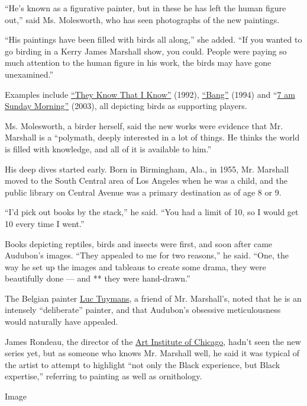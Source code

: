 ``He's known as a figurative painter, but in these he has left the human
figure out,'' said Ms. Molesworth, who has seen photographs of the new
paintings.

``His paintings have been filled with birds all along,'' she added. ``If
you wanted to go birding in a Kerry James Marshall show, you could.
People were paying so much attention to the human figure in his work,
the birds may have gone unexamined.''

Examples include
\href{https://www.metmuseum.org/art/collection/search/668312}{``They
Know That I Know''} (1992),
\href{https://www.metmuseum.org/art/collection/search/668319}{``Bang''}
(1994) and
``\href{https://mcachicago.org/Collection/Items/2003/Kerry-James-Marshall-7am-Sunday-Morning-2003}{7
am Sunday Morning''} (2003), all depicting birds as supporting players.

Ms. Molesworth, a birder herself, said the new works were evidence that
Mr. Marshall is a ``polymath, deeply interested in a lot of things. He
thinks the world is filled with knowledge, and all of it is available to
him.''

His deep dives started early. Born in Birmingham, Ala., in 1955, Mr.
Marshall moved to the South Central area of Los Angeles when he was a
child, and the public library on Central Avenue was a primary
destination as of age 8 or 9.

``I'd pick out books by the stack,'' he said. ``You had a limit of 10,
so I would get 10 every time I went.''

Books depicting reptiles, birds and insects were first, and soon after
came Audubon's images. ``They appealed to me for two reasons,'' he said.
``One, the way he set up the images and tableaus to create some drama,
they were beautifully done --- and ** they were hand-drawn.''

The Belgian painter
\href{https://www.davidzwirner.com/artists/luc-tuymans}{Luc Tuymans}, a
friend of Mr. Marshall's, noted that he is an intensely ``deliberate''
painter, and that Audubon's obsessive meticulousness would naturally
have appealed.

James Rondeau, the director of the
\href{https://www.artic.edu/artists/47905/kerry-james-marshall}{Art
Institute of Chicago}, hadn't seen the new series yet, but as someone
who knows Mr. Marshall well, he said it was typical of the artist to
attempt to highlight ``not only the Black experience, but Black
expertise,'' referring to painting as well as ornithology.

Image


